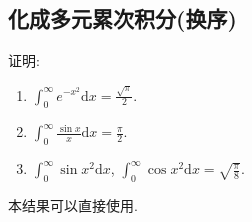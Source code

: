 \documentclass[../../main.tex]{subfiles}
\begin{document}
\subsection{化成多元累次积分(换序)}

\begin{proposition}\label{proposition:重要定积分结果(必记)}
证明:
\begin{enumerate}[(1)]
\item \(\int_{0}^{\infty} e^{-x^{2}}\mathrm{d}x=\frac{\sqrt{\pi}}{2}\).

\item \(\int_{0}^{\infty} \frac{\sin x}{x}\mathrm{d}x=\frac{\pi}{2}\).

\item\(\int_{0}^{\infty} \sin x^{2}\mathrm{d}x\), \(\int_{0}^{\infty} \cos x^{2}\mathrm{d}x=\sqrt{\frac{\pi}{8}}\). 
\end{enumerate}
\end{proposition}
\begin{note}
本结果可以直接使用.
\end{note}
\end{document}
